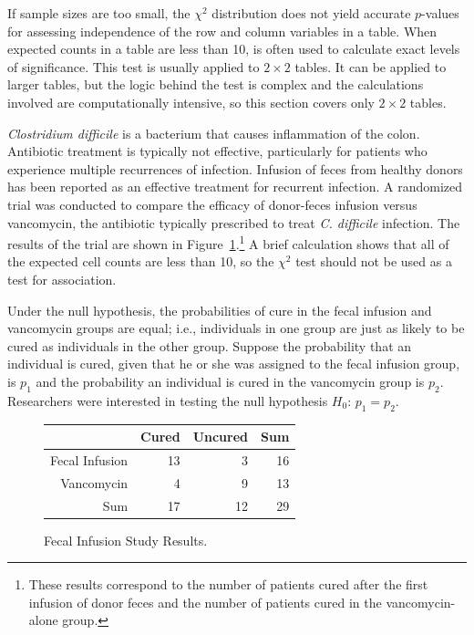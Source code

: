 If sample sizes are too small, the $\chi^2$ distribution does not yield accurate $p$-values for  assessing  independence of the row and column variables in a table.  When expected counts in a table are less than 10,  is often  used to calculate exact levels of significance. This test is usually applied to $2 \times 2$ tables. It can be applied to larger tables, but the logic behind the test is complex and the calculations involved are computationally intensive,  so this section covers only $2 \times 2$ tables. 


\textit{Clostridium difficile} is a bacterium that causes inflammation of the colon. Antibiotic treatment is typically not effective, particularly for patients who experience multiple recurrences of infection. Infusion of feces from healthy donors has been reported as an effective treatment for recurrent infection. A randomized trial was conducted to compare the efficacy of donor-feces infusion versus vancomycin, the antibiotic typically prescribed to treat \textit{C. difficile }infection. The results of the trial are shown in Figure~\ref{fecalStudyResultsTest}.\footnote{These results correspond to the number of patients cured after the first infusion of donor feces and the number of patients cured in the vancomycin-alone group.} A brief calculation shows that all of the expected cell counts are less than 10, so the $\chi^2$ test should not be used as a test for association. 

Under the null hypothesis, the probabilities of cure in the fecal infusion and vancomycin groups are equal; i.e., individuals in one group are just as likely to be cured as individuals in the other group. Suppose the probability that an individual is cured, given that he or she was assigned to the fecal infusion group, is $p_1$ and the probability an individual is cured in the vancomycin group is $p_2$. Researchers were interested in testing the null hypothesis $H_0$: $p_1 = p_2$.


\begin{figure}[h]
	\centering
	\begin{tabular}{rrrr}
		\hline
		& Cured & Uncured & Sum \\ 
		\hline
		Fecal Infusion & 13 & 3 & 16 \\ 
		Vancomycin & 4 & 9 & 13 \\ 
		Sum & 17 & 12 & 29 \\ 
		\hline
	\end{tabular}
	\caption{Fecal Infusion Study Results.} 
	\label{fecalStudyResultsTest}
\end{figure}

